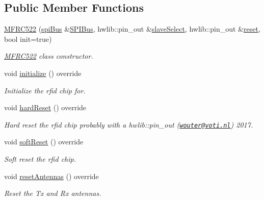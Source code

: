 \subsection*{Public Member Functions}
\begin{DoxyCompactItemize}
\item 
\mbox{\hyperlink{class_m_f_r_c522_a70e6c463aec08918c71c2e0c77742b4b}{M\+F\+R\+C522}} (\mbox{\hyperlink{classspi_bus}{spi\+Bus}} \&\mbox{\hyperlink{class_m_f_r_c522_a76b0186fcad01aafd3d7d7ae4da6a68c}{S\+P\+I\+Bus}}, hwlib\+::pin\+\_\+out \&\mbox{\hyperlink{class_m_f_r_c522_ab945c275a8644e226def9f3eee6698a2}{slave\+Select}}, hwlib\+::pin\+\_\+out \&\mbox{\hyperlink{class_m_f_r_c522_a924c7dced5cb615461a0c9f353076407}{reset}}, bool init=true)
\begin{DoxyCompactList}\small\item\em \mbox{\hyperlink{class_m_f_r_c522}{M\+F\+R\+C522}} class constructor. \end{DoxyCompactList}\item 
void \mbox{\hyperlink{class_m_f_r_c522_a5f589b09eaf150551b369052ce125fa1}{initialize}} () override
\begin{DoxyCompactList}\small\item\em Initialize the rfid chip for. \end{DoxyCompactList}\item 
void \mbox{\hyperlink{class_m_f_r_c522_a016df9ed0421397c634cc79c475dbe3b}{hard\+Reset}} () override
\begin{DoxyCompactList}\small\item\em Hard reset the rfid chip probably with a hwlib\+::pin\+\_\+out (\href{mailto:wouter@voti.nl}{\tt wouter@voti.\+nl}) 2017. \end{DoxyCompactList}\item 
\mbox{\label{class_m_f_r_c522_ae51e1e0bee2b7a65d6314bfb48121f1d}} 
void \mbox{\hyperlink{class_m_f_r_c522_ae51e1e0bee2b7a65d6314bfb48121f1d}{soft\+Reset}} () override
\begin{DoxyCompactList}\small\item\em Soft reset the rfid chip. \end{DoxyCompactList}\item 
void \mbox{\hyperlink{class_m_f_r_c522_ac981022cc3ae79f727b2365e309cf691}{reset\+Antennas}} () override
\begin{DoxyCompactList}\small\item\em Reset the Tx and Rx antennas. \end{DoxyCompactList}\item 

\end{DoxyCompactItemize}
